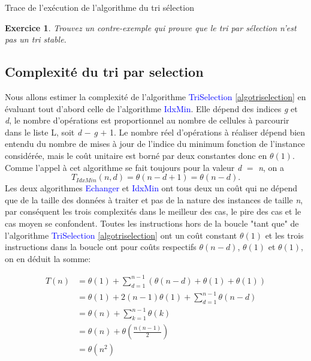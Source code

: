 \documentclass[a4paper,10pt]{article}
\newtheorem{exo}{Exercice}
\begin{document}
\begin{center}
    Trace de l'exécution de l'algorithme du tri sélection
\end{center}

\begin{exo}
    Trouvez un contre-exemple qui prouve que le tri par sélection n'est pas un tri stable.
\end{exo}

\subsection{Complexité du tri par selection}
Nous allons estimer la complexité de l'algorithme \textcolor{blue}{TriSelection} \ref{algotriselection} 
en évaluant tout d'abord celle de l'al­gor­i­thme \textcolor{blue}{IdxMin}. Elle dépend des indices {\itshape g} et {\itshape d},
le nombre d'opérations est pro­por­tion­nel au nombre de cellules à parcourir dans le liste L, soit 
{\itshape d} $-$ {\itshape g} $+$ 1. Le nombre réel d'opérations à réaliser dépend bien entendu du nombre 
de mises à jour de l'indice du minimum fonction de l'instance considérée, mais le coût unitaire est borné par 
deux constantes donc en $\theta(1)$. Comme l'appel à cet al­go­ri­thme se fait toujours pour la valeur
{\itshape d} $=$ {\itshape n}, on a \[ T_{IdxMin}(n,d) = \theta(n - d + 1) = \theta(n - d). \]
Les deux algorithmes \textcolor{blue}{Echanger} et \textcolor{blue}{IdxMin} ont tous deux un coût qui ne 
dépend que de la taille des don­nées à traiter et pas de la nature des instances de taille {\itshape n},
par conséquent les trois complexités dans le meilleur des cas, le pire des cas et le cas moyen se confondent.
Toutes les instructions hors de la boucle "tant que" de l'algorithme \textcolor{blue}{TriSelection} \ref{algotriselection} 
ont un coût constant $\theta(1)$ et les trois instructions dans la boucle ont pour coûts respectifs
$\theta(n - d)$, $\theta(1)$ et $\theta(1)$, on en déduit la somme:

\begin{align*}
    T(n) & = \theta(1) + \sum_{d=1}^{n-1}(\theta(n - d) + \theta(1) + \theta(1)) \\
         & = \theta(1) + 2(n - 1)\theta(1) + \sum_{d=1}^{n-1}\theta(n - d) \\
         & = \theta(n) + \sum_{k=1}^{n-1}\theta(k) \\
         & = \theta(n) + \theta(\frac{n(n - 1)}{2}) \\
         & = \theta(n^2)
\end{align*}
\end{document}
